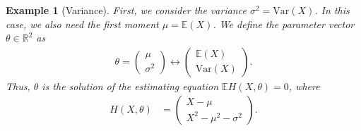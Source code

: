 \documentclass[10pt, a4paper]{article}
\theoremstyle{assumption}
\newtheorem{example}{Example}[section]
\theoremstyle{definition}
\theoremstyle{theorem}
\newcommand{\R}{\mathbb{R}}
\newcommand{\E}{\mathbb{E}}
\begin{document}
\begin{example}[Variance]\label{ex:variance}
    First, we consider the variance $\sigma^2 = \mathrm{Var}(X)$. In this case, we also need the first moment $\mu = \E(X)$. 
    We define the parameter vector $\theta \in \R^2$ as 
    \begin{align*}
        \theta = \begin{pmatrix}
         \mu\\
         \sigma^2
    \end{pmatrix} \leftrightarrow 
    \begin{pmatrix}
            \E(X) \\ 
            \mathrm{Var}(X)
        \end{pmatrix}.
    \end{align*}
    Thus, $\theta$ is the solution of the estimating equation $\E H(X,\theta) = 0$, where 
    \begin{align*}
        H(X,\theta) &= \begin{pmatrix}
            X-\mu\\
            X^2 - \mu^2-\sigma^2
        \end{pmatrix}.
    \end{align*}
\end{example}
\end{document}
